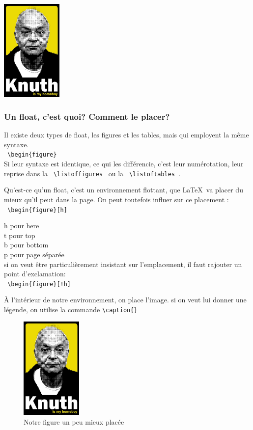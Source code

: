 \documentclass[a4paper,twoside,french,12pt]{article}
\begin{document}
\includegraphics[width=3cm]{knuth.jpg}

\subsubsection{Un float, c'est quoi? Comment le placer?}
Il existe deux types de float, les figures et les tables, mais qui employent la même syntaxe.\\
\verb= \begin{figure} =\\

Si leur syntaxe est identique, ce qui les différencie, c'est leur numérotation, leur reprise dans la \verb= \listoffigures = ou la \verb= \listoftables =.

Qu'est-ce qu'un float, c'est un environnement flottant, que \LaTeX\ va placer du mieux qu'il peut dans la page. On peut toutefois influer sur ce placement :\\
\verb= \begin{figure}[h] =

h pour here\\
t pour top\\
b pour bottom\\
p pour page séparée\\

si on veut être particulièrement insistant sur l'emplacement, il faut rajouter un point d'exclamation:\\
\verb= \begin{figure}[!h] =

À l'intérieur de notre environnement, on place l'image.
si on veut lui donner une légende, on utilise la commande \verb=\caption{}=

\begin{figure}[!h]
\includegraphics[width=3cm]{knuth.jpg}
\caption{Notre figure un peu mieux placée}
\end{figure}
\end{document}
